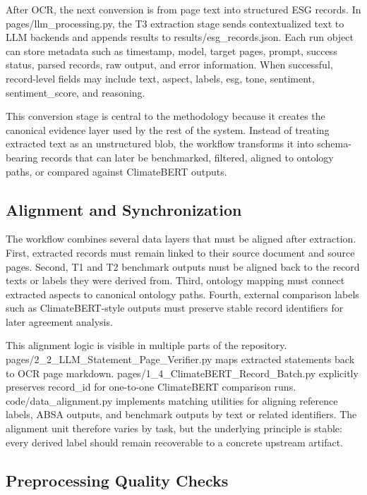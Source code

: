 After OCR, the next conversion is from page text into structured ESG records. In pages/llm\_processing.py, the T3 extraction stage sends contextualized text to LLM backends and appends results to results/esg\_records.json. Each run object can store metadata such as timestamp, model, target pages, prompt, success status, parsed records, raw output, and error information. When successful, record-level fields may include text, aspect, labels, esg, tone, sentiment, sentiment\_score, and reasoning.

This conversion stage is central to the methodology because it creates the canonical evidence layer used by the rest of the system. Instead of treating extracted text as an unstructured blob, the workflow transforms it into schema-bearing records that can later be benchmarked, filtered, aligned to ontology paths, or compared against ClimateBERT outputs.

\subsection{Alignment and Synchronization}

The workflow combines several data layers that must be aligned after extraction. First, extracted records must remain linked to their source document and source pages. Second, T1 and T2 benchmark outputs must be aligned back to the record texts or labels they were derived from. Third, ontology mapping must connect extracted aspects to canonical ontology paths. Fourth, external comparison labels such as ClimateBERT-style outputs must preserve stable record identifiers for later agreement analysis.

This alignment logic is visible in multiple parts of the repository. pages/2\_2\_LLM\_Statement\_Page\_Verifier.py maps extracted statements back to OCR page markdown. pages/1\_4\_ClimateBERT\_Record\_Batch.py explicitly preserves record\_id for one-to-one ClimateBERT comparison runs. code/data\_alignment.py implements matching utilities for aligning reference labels, ABSA outputs, and benchmark outputs by text or related identifiers. The alignment unit therefore varies by task, but the underlying principle is stable: every derived label should remain recoverable to a concrete upstream artifact.

\subsection{Preprocessing Quality Checks}

